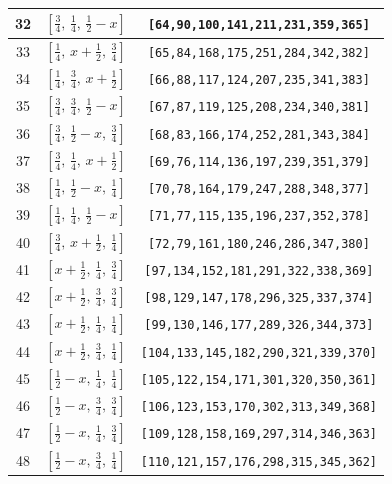 \documentclass[fleqn,8pt]{jsarticle}
\begin{document}
\begin{longtable}{ccc}
32 & $\left[ \frac{3}{4},\, \frac{1}{4},\, \frac{1}{2} - x \right]$ & {\tt [64,90,100,141,211,231,359,365]} \\ \hline
33 & $\left[ \frac{1}{4},\, x + \frac{1}{2},\, \frac{3}{4} \right]$ & {\tt [65,84,168,175,251,284,342,382]} \\ \hline
34 & $\left[ \frac{1}{4},\, \frac{3}{4},\, x + \frac{1}{2} \right]$ & {\tt [66,88,117,124,207,235,341,383]} \\ \hline
35 & $\left[ \frac{3}{4},\, \frac{3}{4},\, \frac{1}{2} - x \right]$ & {\tt [67,87,119,125,208,234,340,381]} \\ \hline
36 & $\left[ \frac{3}{4},\, \frac{1}{2} - x,\, \frac{3}{4} \right]$ & {\tt [68,83,166,174,252,281,343,384]} \\ \hline
37 & $\left[ \frac{3}{4},\, \frac{1}{4},\, x + \frac{1}{2} \right]$ & {\tt [69,76,114,136,197,239,351,379]} \\ \hline
38 & $\left[ \frac{1}{4},\, \frac{1}{2} - x,\, \frac{1}{4} \right]$ & {\tt [70,78,164,179,247,288,348,377]} \\ \hline
39 & $\left[ \frac{1}{4},\, \frac{1}{4},\, \frac{1}{2} - x \right]$ & {\tt [71,77,115,135,196,237,352,378]} \\ \hline
40 & $\left[ \frac{3}{4},\, x + \frac{1}{2},\, \frac{1}{4} \right]$ & {\tt [72,79,161,180,246,286,347,380]} \\ \hline
41 & $\left[ x + \frac{1}{2},\, \frac{1}{4},\, \frac{3}{4} \right]$ & {\tt [97,134,152,181,291,322,338,369]} \\ \hline
42 & $\left[ x + \frac{1}{2},\, \frac{3}{4},\, \frac{3}{4} \right]$ & {\tt [98,129,147,178,296,325,337,374]} \\ \hline
43 & $\left[ x + \frac{1}{2},\, \frac{1}{4},\, \frac{1}{4} \right]$ & {\tt [99,130,146,177,289,326,344,373]} \\ \hline
44 & $\left[ x + \frac{1}{2},\, \frac{3}{4},\, \frac{1}{4} \right]$ & {\tt [104,133,145,182,290,321,339,370]} \\ \hline
45 & $\left[ \frac{1}{2} - x,\, \frac{1}{4},\, \frac{1}{4} \right]$ & {\tt [105,122,154,171,301,320,350,361]} \\ \hline
46 & $\left[ \frac{1}{2} - x,\, \frac{3}{4},\, \frac{3}{4} \right]$ & {\tt [106,123,153,170,302,313,349,368]} \\ \hline
47 & $\left[ \frac{1}{2} - x,\, \frac{1}{4},\, \frac{3}{4} \right]$ & {\tt [109,128,158,169,297,314,346,363]} \\ \hline
48 & $\left[ \frac{1}{2} - x,\, \frac{3}{4},\, \frac{1}{4} \right]$ & {\tt [110,121,157,176,298,315,345,362]} \\
\end{longtable}
\end{document}
